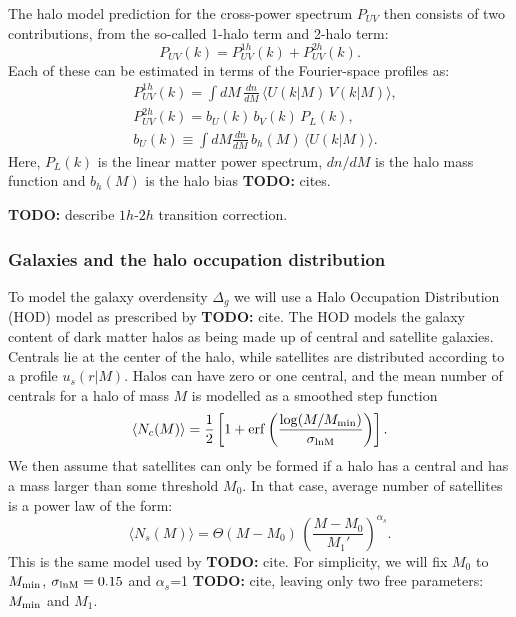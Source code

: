 \documentclass[useAMS,usenatbib]{mn2e}
\newcommand{\TODO}[1]{{\bf TODO:} #1}
\begin{document}
    The halo model prediction for the cross-power spectrum $P_{UV}$ then consists of two contributions, from the so-called 1-halo term and 2-halo term:
    \begin{equation}
      P_{UV}(k)=P^{1h}_{UV}(k)+P^{2h}_{UV}(k).
    \end{equation}
    Each of these can be estimated in terms of the Fourier-space profiles as:
    \begin{align}
      &P^{1h}_{UV}(k)=\int dM\,\frac{dn}{dM}\,\langle U(k|M)\,V(k|M)\rangle,\\
      &P^{2h}_{UV}(k)=b_U(k)\,b_V(k)\,P_L(k),\\
      &b_U(k)\equiv\int dM\frac{dn}{dM}\,b_h(M)\,\langle U(k|M)\rangle.
    \end{align}
    Here, $P_L(k)$ is the linear matter power spectrum, $dn/dM$ is the halo mass function and $b_h(M)$ is the halo bias \TODO{cites}. %
    
    \TODO{describe $1h$-$2h$ transition correction.}
    
    \subsubsection{Galaxies and the halo occupation distribution}\label{sssec:theory.hm.hod}
      To model the galaxy overdensity $\Delta_g$ we will use a Halo Occupation Distribution (HOD) model as prescribed by \TODO{cite}. The HOD models the galaxy content of dark matter halos as being made up of central and satellite galaxies. Centrals lie at the center of the halo, while satellites are distributed according to a profile $u_s(r|M)$. Halos can have zero or one central, and the mean number of centrals for a halo of mass $M$ is modelled as a smoothed step function
      \begin{equation}
        \langle N_c(M)\rangle=\frac{1}{2}\left[1+{\rm erf}\left(\frac{\log(M/M_{\rm min})}{\sigma_{\rm lnM}}\right)\right].
      \end{equation}
      We then assume that satellites can only be formed if a halo has a central and has a mass larger than some threshold $M_0$. In that case, average number of satellites is a power law of the form:
      \begin{equation}
        \langle N_s(M)\rangle=\Theta(M-M_0)\,\left(\frac{M-M_0}{M_1'}\right)^{\alpha_s}.
      \end{equation}
      This is the same model used by \TODO{cite}. For simplicity, we will fix $M_0$ to $M_{\rm min}$, $\sigma_{\rm lnM}=0.15$ and $\alpha_s$=1 \TODO{cite}, leaving only two free parameters: $M_{\rm min}$ and $M_1$.
      
\end{document}
